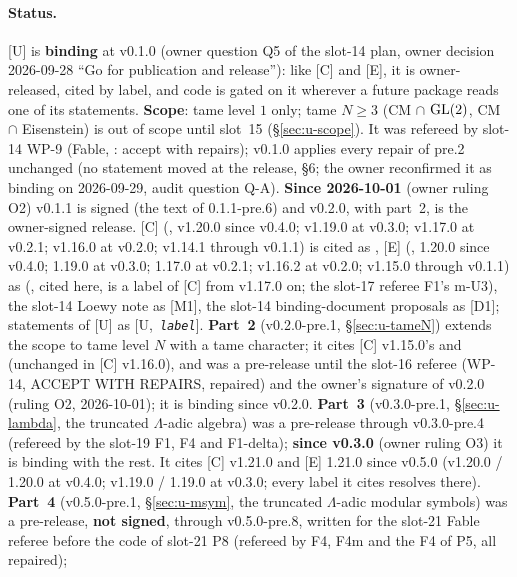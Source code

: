 \documentclass[11pt]{article}
\newcommand{\Iw}{\Lambda}                         %
\newcommand{\Uspec}[1]{[U,~\texttt{#1}]}
\begin{document}
\paragraph{Status.} [U] is \textbf{binding} at v0.1.0 (owner question Q5 of the slot-14 plan, owner decision
2026-09-28 ``Go for publication and release''): like [C] and [E], it is owner-released, cited by label, and
code is gated on it wherever a future package reads one of its statements. \textbf{Scope}: tame level $1$
only; tame $N\ge3$ (CM $\cap$ $\mathrm{GL}(2)$, CM $\cap$ Eisenstein) is out of scope until slot~15
(\S\ref{sec:u-scope}). It was refereed by slot-14 WP-9
(Fable, : accept with repairs); v0.1.0 applies every repair
of pre.2 unchanged (no statement moved at the release, 
\S6; the owner reconfirmed it as binding on 2026-09-29, audit question Q-A). \textbf{Since 2026-10-01} (owner ruling O2) v0.1.1 is signed (the text of
0.1.1-pre.6) and v0.2.0, with part~2, is the owner-signed release. [C] (, v1.20.0 since v0.4.0; v1.19.0 at v0.3.0; v1.17.0 at v0.2.1; v1.16.0 at v0.2.0; v1.14.1 through v0.1.1) is cited as ,
[E] (, 1.20.0 since v0.4.0; 1.19.0 at v0.3.0; 1.17.0 at v0.2.1; v1.16.2 at v0.2.0; v1.15.0 through v0.1.1) as  (, cited here, is a label of
[C] from v1.17.0 on; the slot-17 referee F1's m-U3), the slot-14 Loewy note 
as [M1], the slot-14 binding-document proposals  as [D1];
statements of [U] as \Uspec{\textit{label}}. \textbf{Part~2} (v0.2.0-pre.1, \S\ref{sec:u-tameN}) extends the scope to tame level $N$ with a tame character; it cites
[C] v1.15.0's  and  (unchanged in [C] v1.16.0), and was a pre-release until the slot-16 referee (WP-14, ACCEPT WITH REPAIRS, repaired)
and the owner's signature of v0.2.0 (ruling O2, 2026-10-01); it is binding since v0.2.0. \textbf{Part~3} (v0.3.0-pre.1, \S\ref{sec:u-lambda}, the truncated $\Iw$-adic
algebra) was a pre-release through v0.3.0-pre.4 (refereed by the slot-19 F1, F4 and F1-delta); \textbf{since v0.3.0} (owner ruling O3) it is binding with the rest.
It cites [C] v1.21.0 and [E] 1.21.0 since v0.5.0 (v1.20.0 / 1.20.0 at v0.4.0; v1.19.0 / 1.19.0 at v0.3.0; every label it cites resolves there). \textbf{Part~4} (v0.5.0-pre.1, \S\ref{sec:u-msym}, the
truncated $\Iw$-adic modular symbols) was a pre-release, \textbf{not signed}, through v0.5.0-pre.8, written for the slot-21 Fable referee before the code of slot-21 P8 (refereed by F4, F4m and the F4 of P5, all repaired);
\end{document}
